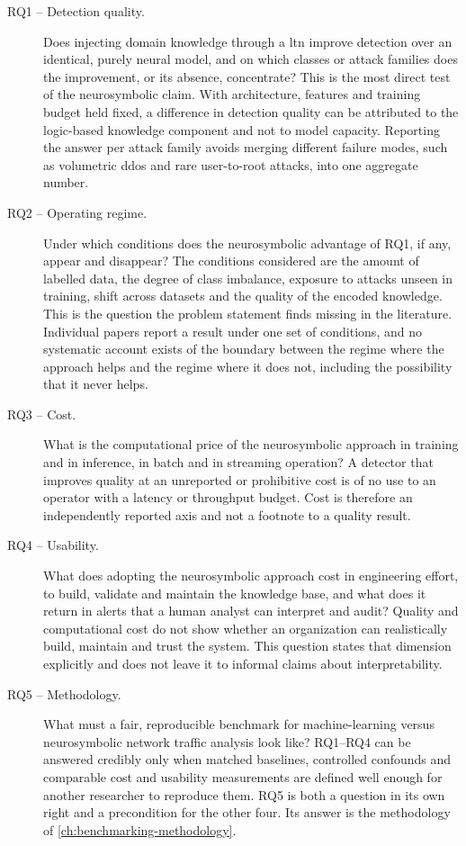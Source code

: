 \begin{description}
  \item[RQ1 -- Detection quality.] Does injecting domain knowledge through
    a \gls{ltn} improve detection over an identical, purely neural model,
    and on which classes or attack families does the improvement, or its
    absence, concentrate? This is the most direct test of the neurosymbolic
    claim. With architecture, features and training budget held fixed, a
    difference in detection quality can be attributed to the logic-based
    knowledge component and not to model capacity. Reporting the answer per
    attack family avoids merging different failure modes, such as volumetric
    \gls{ddos} and rare user-to-root attacks, into one aggregate number.

  \item[RQ2 -- Operating regime.] Under which conditions does the
    neurosymbolic advantage of RQ1, if any, appear and disappear? The
    conditions considered are the amount of labelled data, the degree of
    class imbalance, exposure to attacks unseen in training, shift across
    datasets and the quality of the encoded knowledge. This is the question
    the problem statement finds missing in the literature. Individual papers
    report a result under one set of conditions, and no systematic account
    exists of the boundary between the regime where the approach helps and
    the regime where it does not, including the possibility that it never
    helps.

  \item[RQ3 -- Cost.] What is the computational price of the neurosymbolic
    approach in training and in inference, in batch and in streaming
    operation? A detector that improves quality at an unreported or
    prohibitive cost is of no use to an operator with a latency or
    throughput budget. Cost is therefore an independently reported axis and
    not a footnote to a quality result.

  \item[RQ4 -- Usability.] What does adopting the neurosymbolic approach
    cost in engineering effort, to build, validate and maintain the
    knowledge base, and what does it return in alerts that a human analyst
    can interpret and audit? Quality and computational cost do not show
    whether an organization can realistically build, maintain and trust the
    system. This question states that dimension explicitly and does not
    leave it to informal claims about interpretability.

  \item[RQ5 -- Methodology.] What must a fair, reproducible benchmark for
    machine-learning versus neurosymbolic network traffic analysis look
    like? RQ1--RQ4 can be answered credibly only when matched baselines,
    controlled confounds and comparable cost and usability measurements are
    defined well enough for another researcher to reproduce them. RQ5 is
    both a question in its own right and a precondition for the other four.
    Its answer is the methodology of \cref{ch:benchmarking-methodology}.
\end{description}

